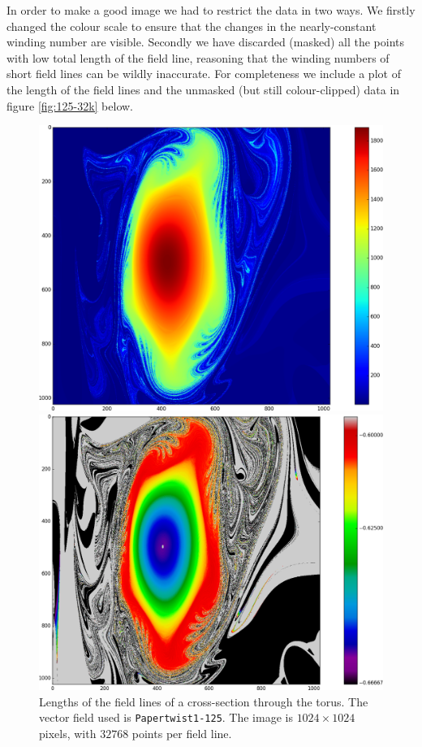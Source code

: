 \documentclass{article}
\begin{document}
In order to make a good image we had to restrict the data in two ways. We firstly changed the colour scale to ensure that the changes in the nearly-constant winding number are visible. Secondly we have discarded (masked) all the points with low total length of the field line, reasoning that the winding numbers of short field lines can be wildly inaccurate. For completeness we include a plot of the length of the field lines and the unmasked (but still colour-clipped) data in figure \ref{fig:125-32k} below.\\

\begin{figure}[!hb]
  \includegraphics[width=\linewidth]{Figures/Rings_Papertwist_twist1_125_lengths_steps32k.png}
	\caption{Lengths of the field lines of a cross-section through the torus. The vector field used is \texttt{Papertwist1-125}. The image is $1024\times 1024$ pixels, with $32768$ points per field line.}\label{fig:125-lengths}
\endminipage\hfill
{}
  \includegraphics[width=\linewidth]{Figures/Rings_Papertwist_twist1_125_nomask_steps32k.png}

\end{figure}
\end{document}
